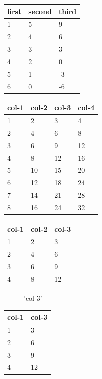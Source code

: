 \documentclass[11pt,a4paper]{article}
\begin{document}
\begin{table}[h]
\begin{tabular}{|l|l|l|}
\hline
first  & second  & third \\ \hline
1 & 5 & 9 \\ \hline
2 & 4 & 6 \\ \hline
3 & 3 & 3 \\ \hline
4 & 2 & 0 \\ \hline
5 & 1 & -3 \\ \hline
6 & 0 & -6 \\ \hline
\end{tabular}
\end{table}

\begin{table}[h]
\begin{tabular}{|l|l|l|l|}
\hline
col-1 & col-2 & col-3 & col-4 \\ \hline
1 & 2 & 3 & 4 \\ \hline
2 & 4 & 6 & 8 \\ \hline
3 & 6 & 9 & 12 \\ \hline
4 & 8 & 12 & 16 \\ \hline
5 & 10 & 15 & 20 \\ \hline
6 & 12 & 18 & 24 \\ \hline
7 & 14 & 21 & 28 \\ \hline
8 & 16 & 24 & 32 \\ \hline
\end{tabular}
\end{table}

\begin{table}[h]
\begin{tabular}{|l|l|l|}
\hline
col-1 & col-2 & col-3 \\ \hline
1 & 2 & 3 \\ \hline
2 & 4 & 6 \\ \hline
3 & 6 & 9 \\ \hline
4 & 8 & 12 \\ \hline
\end{tabular}
\end{table}

\begin{figure}[h]
\caption{'col-3'}
\end{figure}

\begin{table}[h]
\begin{tabular}{|l|l|}
\hline
col-1 & col-3 \\ \hline
1 & 3 \\ \hline
2 & 6 \\ \hline
3 & 9 \\ \hline
4 & 12 \\ \hline
\end{tabular}
\end{table}
\end{document}
